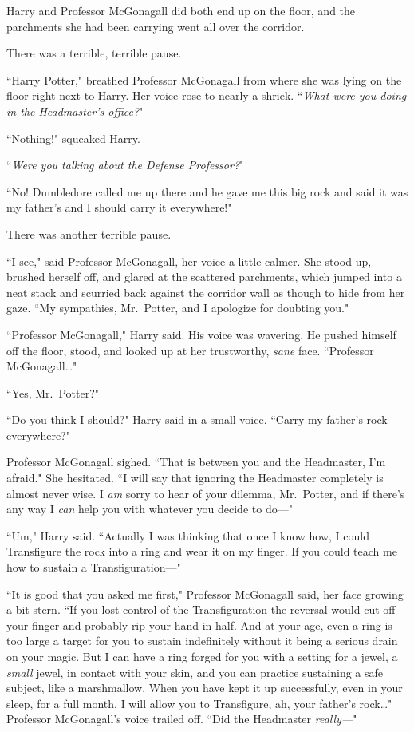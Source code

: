 Harry and Professor McGonagall did both end up on the floor, and the parchments she had been carrying went all over the corridor.

There was a terrible, terrible pause.

``Harry Potter," breathed Professor McGonagall from where she was lying on the floor right next to Harry. Her voice rose to nearly a shriek. ``\emph{What were you doing in the Headmaster's office?}"

``Nothing!" squeaked Harry.

``\emph{Were you talking about the Defense Professor?}"

``No! Dumbledore called me up there and he gave me this big rock and said it was my father's and I should carry it everywhere!"

There was another terrible pause.

``I see," said Professor McGonagall, her voice a little calmer. She stood up, brushed herself off, and glared at the scattered parchments, which jumped into a neat stack and scurried back against the corridor wall as though to hide from her gaze. ``My sympathies, Mr.~Potter, and I apologize for doubting you."

``Professor McGonagall," Harry said. His voice was wavering. He pushed himself off the floor, stood, and looked up at her trustworthy, \emph{sane} face. ``Professor McGonagall{\ldots}"

``Yes, Mr.~Potter?"

``Do you think I should?" Harry said in a small voice. ``Carry my father's rock everywhere?"

Professor McGonagall sighed. ``That is between you and the Headmaster, I'm afraid." She hesitated. ``I will say that ignoring the Headmaster completely is almost never wise. I \emph{am} sorry to hear of your dilemma, Mr.~Potter, and if there's any way I \emph{can} help you with whatever you decide to do—"

``Um," Harry said. ``Actually I was thinking that once I know how, I could Transfigure the rock into a ring and wear it on my finger. If you could teach me how to sustain a Transfiguration—"

``It is good that you asked me first," Professor McGonagall said, her face growing a bit stern. ``If you lost control of the Transfiguration the reversal would cut off your finger and probably rip your hand in half. And at your age, even a ring is too large a target for you to sustain indefinitely without it being a serious drain on your magic. But I can have a ring forged for you with a setting for a jewel, a \emph{small} jewel, in contact with your skin, and you can practice sustaining a safe subject, like a marshmallow. When you have kept it up successfully, even in your sleep, for a full month, I will allow you to Transfigure, ah, your father's rock{\ldots}" Professor McGonagall's voice trailed off. ``Did the Headmaster \emph{really—}"

